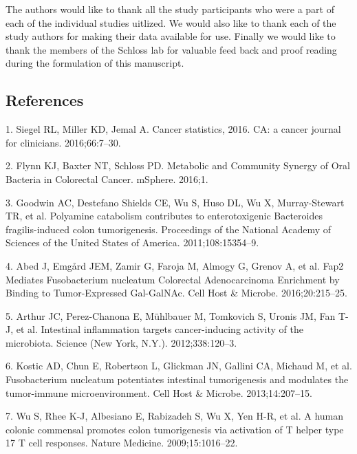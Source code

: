 \documentclass[12pt,]{article}
\begin{document}
The authors would like to thank all the study participants who were a
part of each of the individual studies uitlized. We would also like to
thank each of the study authors for making their data available for use.
Finally we would like to thank the members of the Schloss lab for
valuable feed back and proof reading during the formulation of this
manuscript.

\newpage

\subsection{References}\label{references}

\hypertarget{refs}{}
\hypertarget{ref-siegel_cancer_2016}{}
1. Siegel RL, Miller KD, Jemal A. Cancer statistics, 2016. CA: a cancer
journal for clinicians. 2016;66:7--30.

\hypertarget{ref-flynn_metabolic_2016}{}
2. Flynn KJ, Baxter NT, Schloss PD. Metabolic and Community Synergy of
Oral Bacteria in Colorectal Cancer. mSphere. 2016;1.

\hypertarget{ref-goodwin_polyamine_2011}{}
3. Goodwin AC, Destefano Shields CE, Wu S, Huso DL, Wu X, Murray-Stewart
TR, et al. Polyamine catabolism contributes to enterotoxigenic
Bacteroides fragilis-induced colon tumorigenesis. Proceedings of the
National Academy of Sciences of the United States of America.
2011;108:15354--9.

\hypertarget{ref-abed_fap2_2016}{}
4. Abed J, Emgård JEM, Zamir G, Faroja M, Almogy G, Grenov A, et al.
Fap2 Mediates Fusobacterium nucleatum Colorectal Adenocarcinoma
Enrichment by Binding to Tumor-Expressed Gal-GalNAc. Cell Host \&
Microbe. 2016;20:215--25.

\hypertarget{ref-arthur_intestinal_2012}{}
5. Arthur JC, Perez-Chanona E, Mühlbauer M, Tomkovich S, Uronis JM, Fan
T-J, et al. Intestinal inflammation targets cancer-inducing activity of
the microbiota. Science (New York, N.Y.). 2012;338:120--3.

\hypertarget{ref-kostic_fusobacterium_2013}{}
6. Kostic AD, Chun E, Robertson L, Glickman JN, Gallini CA, Michaud M,
et al. Fusobacterium nucleatum potentiates intestinal tumorigenesis and
modulates the tumor-immune microenvironment. Cell Host \& Microbe.
2013;14:207--15.

\hypertarget{ref-wu_human_2009}{}
7. Wu S, Rhee K-J, Albesiano E, Rabizadeh S, Wu X, Yen H-R, et al. A
human colonic commensal promotes colon tumorigenesis via activation of T
helper type 17 T cell responses. Nature Medicine. 2009;15:1016--22.
\end{document}
